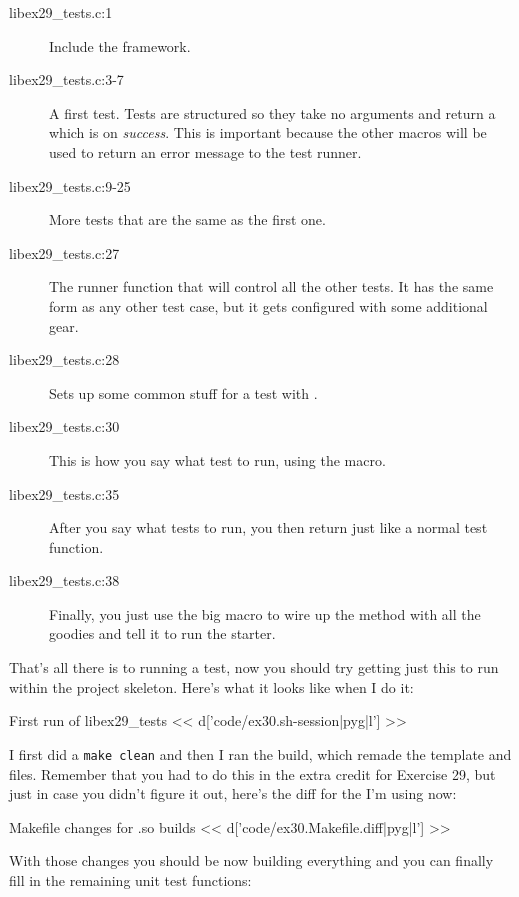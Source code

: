 \begin{description}
\item[libex29\_tests.c:1] Include the  framework.
\item[libex29\_tests.c:3-7] A first test.  Tests are structured so they take no
    arguments and return a  which is  on \emph{success}.
    This is important because the other macros will be used to return an error
    message to the test runner.
\item[libex29\_tests.c:9-25] More tests that are the same as the first one.
\item[libex29\_tests.c:27] The runner function that will control all the other
    tests.  It has the same form as any other test case, but it gets configured
    with some additional gear.
\item[libex29\_tests.c:28] Sets up some common stuff for a test with .
\item[libex29\_tests.c:30] This is how you say what test to run, using the  macro.
\item[libex29\_tests.c:35] After you say what tests to run, you then return  just like a normal test function.
\item[libex29\_tests.c:38] Finally, you just use the big  macro
    to wire up the  method with all the goodies and tell it to run
    the  starter.
\end{description}

That's all there is to running a test, now you should try getting just this to run
within the project skeleton.  Here's what it looks like when I do it:

\begin{code}{First run of libex29\_tests}
<< d['code/ex30.sh-session|pyg|l'] >>
\end{code}

I first did a \verb|make clean| and then I ran the build, which remade the template
 and  files.  Remember that you
had to do this in the extra credit for Exercise 29, but just in case you didn't figure
it out, here's the diff for the  I'm using now:

\begin{code}{Makefile changes for .so builds}
<< d['code/ex30.Makefile.diff|pyg|l'] >>
\end{code}

With those changes you should be now building everything and you can finally
fill in the remaining unit test functions:

